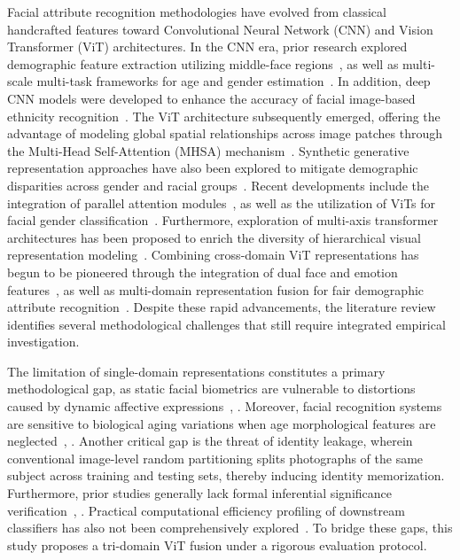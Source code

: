 Facial attribute recognition methodologies have evolved from classical handcrafted features toward Convolutional Neural Network (CNN) and Vision Transformer (ViT) architectures. In the CNN era, prior research explored demographic feature extraction utilizing middle-face regions~\cite{ref11}, as well as multi-scale multi-task frameworks for age and gender estimation~\cite{ref12}. In addition, deep CNN models were developed to enhance the accuracy of facial image-based ethnicity recognition~\cite{ref13}. The ViT architecture subsequently emerged, offering the advantage of modeling global spatial relationships across image patches through the Multi-Head Self-Attention (MHSA) mechanism~\cite{ref14}. Synthetic generative representation approaches have also been explored to mitigate demographic disparities across gender and racial groups~\cite{ref15}. Recent developments include the integration of parallel attention modules~\cite{ref16}, as well as the utilization of ViTs for facial gender classification~\cite{ref17}. Furthermore, exploration of multi-axis transformer architectures has been proposed to enrich the diversity of hierarchical visual representation modeling~\cite{ref18}. Combining cross-domain ViT representations has begun to be pioneered through the integration of dual face and emotion features~\cite{ref19}, as well as multi-domain representation fusion for fair demographic attribute recognition~\cite{ref20}. Despite these rapid advancements, the literature review identifies several methodological challenges that still require integrated empirical investigation.

The limitation of single-domain representations constitutes a primary methodological gap, as static facial biometrics are vulnerable to distortions caused by dynamic affective expressions~\cite{ref11}, \cite{ref17}. Moreover, facial recognition systems are sensitive to biological aging variations when age morphological features are neglected~\cite{ref12}, \cite{ref18}. Another critical gap is the threat of identity leakage, wherein conventional image-level random partitioning splits photographs of the same subject across training and testing sets, thereby inducing identity memorization. Furthermore, prior studies generally lack formal inferential significance verification~\cite{ref13}, \cite{ref19}. Practical computational efficiency profiling of downstream classifiers has also not been comprehensively explored~\cite{ref20}. To bridge these gaps, this study proposes a tri-domain ViT fusion under a rigorous evaluation protocol.

